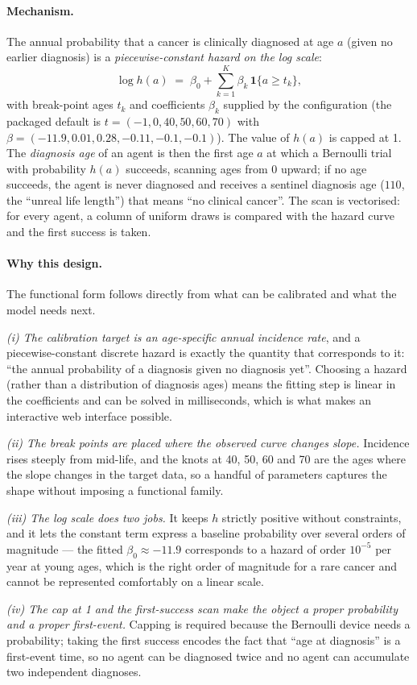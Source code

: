 \documentclass[12pt,a4paper]{article}
\newcommand{\mech}[1]{\paragraph{Mechanism.} #1}
\newcommand{\why}[1]{\paragraph{Why this design.} #1}
\begin{document}
\mech{The annual probability that a cancer is clinically diagnosed at age $a$ (given no earlier
diagnosis) is a \emph{piecewise-constant hazard on the log scale}:
\[
\log h(a) \;=\; \beta_0 + \sum_{k=1}^{K}\beta_k\,\mathbf{1}\{a \ge t_k\},
\]
with break-point ages $t_k$ and coefficients $\beta_k$ supplied by the configuration (the packaged
default is $t = (-1,0,40,50,60,70)$ with $\beta = (-11.9,0.01,0.28,-0.11,-0.1,-0.1)$). The value of
$h(a)$ is capped at 1. The \emph{diagnosis age} of an agent is then the first age $a$ at which a
Bernoulli trial with probability $h(a)$ succeeds, scanning ages from 0 upward; if no age succeeds, the
agent is never diagnosed and receives a sentinel diagnosis age ($110$, the ``unreal life length'') that
means ``no clinical cancer''. The scan is vectorised: for every agent, a column of uniform draws is
compared with the hazard curve and the first success is taken.}

\why{The functional form follows directly from what can be calibrated and what the model needs next.

\emph{(i) The calibration target is an age-specific annual incidence rate}, and a piecewise-constant
discrete hazard is exactly the quantity that corresponds to it: ``the annual probability of a diagnosis
given no diagnosis yet''. Choosing a hazard (rather than a distribution of diagnosis ages) means the
fitting step is linear in the coefficients and can be solved in milliseconds, which is what makes an
interactive web interface possible.

\emph{(ii) The break points are placed where the observed curve changes slope.} Incidence rises steeply
from mid-life, and the knots at 40, 50, 60 and 70 are the ages where the slope changes in the target
data, so a handful of parameters captures the shape without imposing a functional family.

\emph{(iii) The log scale does two jobs.} It keeps $h$ strictly positive without constraints, and it lets
the constant term express a baseline probability over several orders of magnitude --- the fitted
$\beta_0 \approx -11.9$ corresponds to a hazard of order $10^{-5}$ per year at young ages, which is the
right order of magnitude for a rare cancer and cannot be represented comfortably on a linear scale.

\emph{(iv) The cap at 1 and the first-success scan make the object a proper probability and a proper
first-event.} Capping is required because the Bernoulli device needs a probability; taking the first
success encodes the fact that ``age at diagnosis'' is a first-event time, so no agent can be diagnosed
twice and no agent can accumulate two independent diagnoses.}
\end{document}
